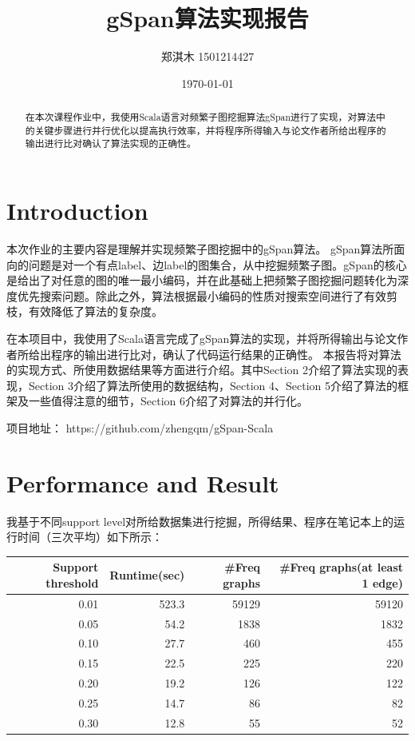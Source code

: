 \documentclass{article}
\title{gSpan算法实现报告}
\author{郑淇木  1501214427}
\date{\today}
\begin{document}
\maketitle

\begin{abstract}
在本次课程作业中，我使用Scala语言对频繁子图挖掘算法gSpan进行了实现，对算法中的关键步骤进行并行优化以提高执行效率，并将程序所得输入与论文作者所给出程序的输出进行比对确认了算法实现的正确性。

\end{abstract}


\section{Introduction}
本次作业的主要内容是理解并实现频繁子图挖掘中的gSpan算法\cite{gspan2002,gspanlong}。
gSpan算法所面向的问题是对一个有点label、边label的图集合，从中挖掘频繁子图。gSpan的核心是给出了对任意的图的唯一最小编码，并在此基础上把频繁子图挖掘问题转化为深度优先搜索问题。除此之外，算法根据最小编码的性质对搜索空间进行了有效剪枝，有效降低了算法的复杂度。

在本项目中，我使用了Scala语言完成了gSpan算法的实现，并将所得输出与论文作者所给出程序的输出进行比对，确认了代码运行结果的正确性。
本报告将对算法的实现方式、所使用数据结果等方面进行介绍。其中Section 2介绍了算法实现的表现，Section 3介绍了算法所使用的数据结构，Section 4、Section 5介绍了算法的框架及一些值得注意的细节，Section 6介绍了对算法的并行化。

项目地址： https://github.com/zhengqm/gSpan-Scala

\section{Performance and Result}

我基于不同support level对所给数据集进行挖掘，所得结果、程序在笔记本上的运行时间（三次平均）如下所示：

\vspace{0.3cm}
\begin{tabular}{rrrr}
\toprule
 Support threshold&  Runtime(sec) &  \#Freq graphs &  \#Freq graphs(at least 1 edge) \\
\midrule
    0.01 &       523.3 &            59129 &                              59120 \\
    0.05 &        54.2 &             1838 &                               1832 \\
    0.10 &        27.7 &              460 &                                455 \\
    0.15 &        22.5 &              225 &                                220 \\
    0.20 &        19.2 &              126 &                                122 \\
    0.25 &        14.7 &               86 &                                 82 \\
    0.30 &        12.8 &               55 &                                 52 \\
\bottomrule
\end{tabular}
\vspace{0.3cm}
\end{document}
